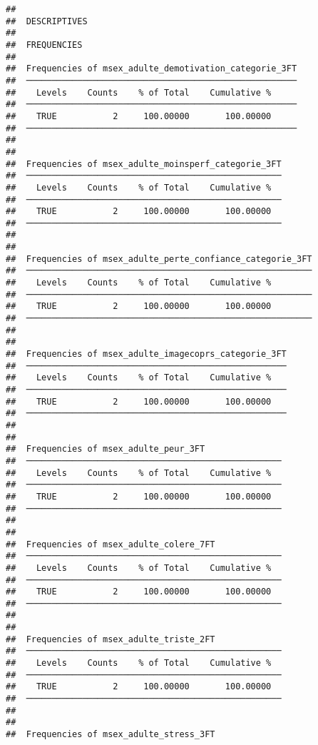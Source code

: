 \documentclass[
]{article}
\begin{document}
\begin{verbatim}
## 
##  DESCRIPTIVES
## 
##  FREQUENCIES
## 
##  Frequencies of msex_adulte_demotivation_categorie_3FT 
##  ───────────────────────────────────────────────────── 
##    Levels    Counts    % of Total    Cumulative %   
##  ───────────────────────────────────────────────────── 
##    TRUE           2     100.00000       100.00000   
##  ───────────────────────────────────────────────────── 
## 
## 
##  Frequencies of msex_adulte_moinsperf_categorie_3FT 
##  ────────────────────────────────────────────────── 
##    Levels    Counts    % of Total    Cumulative %   
##  ────────────────────────────────────────────────── 
##    TRUE           2     100.00000       100.00000   
##  ────────────────────────────────────────────────── 
## 
## 
##  Frequencies of msex_adulte_perte_confiance_categorie_3FT 
##  ──────────────────────────────────────────────────────── 
##    Levels    Counts    % of Total    Cumulative %   
##  ──────────────────────────────────────────────────────── 
##    TRUE           2     100.00000       100.00000   
##  ──────────────────────────────────────────────────────── 
## 
## 
##  Frequencies of msex_adulte_imagecoprs_categorie_3FT 
##  ─────────────────────────────────────────────────── 
##    Levels    Counts    % of Total    Cumulative %   
##  ─────────────────────────────────────────────────── 
##    TRUE           2     100.00000       100.00000   
##  ─────────────────────────────────────────────────── 
## 
## 
##  Frequencies of msex_adulte_peur_3FT                
##  ────────────────────────────────────────────────── 
##    Levels    Counts    % of Total    Cumulative %   
##  ────────────────────────────────────────────────── 
##    TRUE           2     100.00000       100.00000   
##  ────────────────────────────────────────────────── 
## 
## 
##  Frequencies of msex_adulte_colere_7FT              
##  ────────────────────────────────────────────────── 
##    Levels    Counts    % of Total    Cumulative %   
##  ────────────────────────────────────────────────── 
##    TRUE           2     100.00000       100.00000   
##  ────────────────────────────────────────────────── 
## 
## 
##  Frequencies of msex_adulte_triste_2FT              
##  ────────────────────────────────────────────────── 
##    Levels    Counts    % of Total    Cumulative %   
##  ────────────────────────────────────────────────── 
##    TRUE           2     100.00000       100.00000   
##  ────────────────────────────────────────────────── 
## 
## 
##  Frequencies of msex_adulte_stress_3FT              

\end{verbatim}
\end{document}
